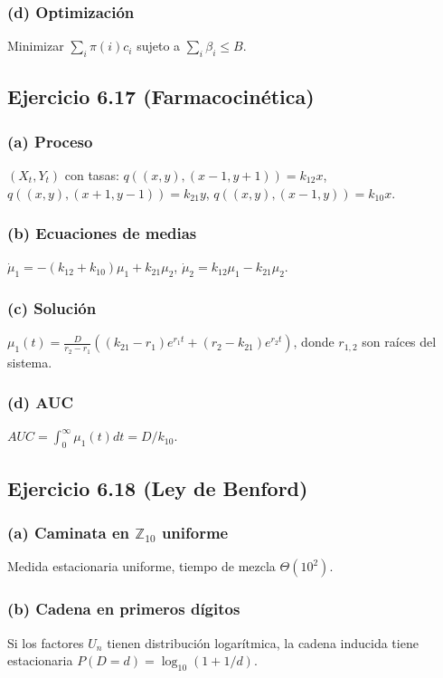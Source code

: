 \documentclass[letterpaper, 12pt]{article}
\newcommand{\Z}{\mathbb{Z}}
\newcommand{\1}{\mathbbm{1}}
\begin{document}
    \subsubsection*{(d) Optimizaci\'on}
    Minimizar $\sum_i\pi(i)c_i$ sujeto a $\sum_i\beta_i\le B$.

    \subsection{Ejercicio 6.17 (Farmacocin\'etica)}

    \subsubsection*{(a) Proceso}
    $(X_t,Y_t)$ con tasas: $q((x,y),(x-1,y+1))=k_{12}x$, $q((x,y),(x+1,y-1))=k_{21}y$, $q((x,y),(x-1,y))=k_{10}x$.

    \subsubsection*{(b) Ecuaciones de medias}
    $\dot{\mu}_1=-(k_{12}+k_{10})\mu_1+k_{21}\mu_2$, $\dot{\mu}_2=k_{12}\mu_1-k_{21}\mu_2$.

    \subsubsection*{(c) Soluci\'on}
    $\mu_1(t)=\frac{D}{r_2-r_1}\left((k_{21}-r_1)e^{r_1t}+(r_2-k_{21})e^{r_2t}\right)$, donde $r_{1,2}$ son ra\'ices del sistema.

    \subsubsection*{(d) AUC}
    $AUC=\int_0^\infty\mu_1(t)dt=D/k_{10}$.

    \subsection{Ejercicio 6.18 (Ley de Benford)}

    \subsubsection*{(a) Caminata en $\Z_{10}$ uniforme}
    Medida estacionaria uniforme, tiempo de mezcla $\Theta(10^2)$.

    \subsubsection*{(b) Cadena en primeros d\'igitos}
    Si los factores $U_n$ tienen distribuci\'on logar\'itmica, la cadena inducida tiene estacionaria $P(D=d)=\log_{10}(1+1/d)$.
\end{document}
